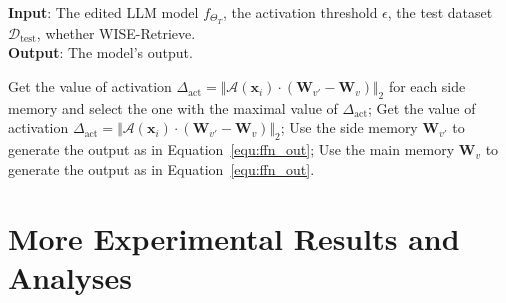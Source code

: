 \documentclass{article}
\begin{document}
\begin{algorithm}[h]
\caption{WISE Inference Stage}
\label{alg:wise_inference}
\textbf{Input}: The edited LLM model $f_{\Theta_T}$, the activation threshold $\epsilon$, the test dataset $\mathcal{D}_{\text{test}}$, whether WISE-Retrieve.\\
\textbf{Output}: The model's output.
\begin{algorithmic}[1] %
            \STATE Get the value of activation $\Delta_{\text{act}} = \Vert \mathcal{A}(\mathbf{x}_i) \cdot (\mathbf{W}_{v'} - \mathbf{W}_v) \Vert_2$ for each side memory and select the one with the maximal value of $\Delta_{\text{act}}$;
            \ELSE 
                \STATE Get the value of activation $\Delta_{\text{act}} = \Vert \mathcal{A}(\mathbf{x}_i) \cdot (\mathbf{W}_{v'} - \mathbf{W}_v) \Vert_2$;
        \ENDIF
            \STATE Use the side memory $\mathbf{W}_{v'}$ to generate the output as in Equation~\ref{equ:ffn_out};
        \ELSE
            \STATE Use the main memory $\mathbf{W}_{v}$ to generate the output as in Equation~\ref{equ:ffn_out}.
        \ENDIF
    \ENDFOR
\end{algorithmic}
\end{algorithm}







\section{More Experimental Results and Analyses} \label{app_sec:more_results}
% 
        
\end{document}
